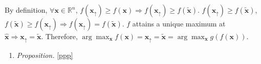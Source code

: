 \documentclass{article}
\numberwithin{equation}{section}
\begin{document}
By definition, $ \forall \mathbf{x} \in \mathbb{R}^n $,
$ f(\mathbf{x}_\uparrow) \ge f(\mathbf{x}) \Rightarrow
f(\mathbf{x}_\uparrow) \ge f(\tilde{\mathbf{x}}) $. $ f(\mathbf{x}_\uparrow)
\ge f(\tilde{\mathbf{x}}) $, $ f(\tilde{\mathbf{x}}) \ge
f(\mathbf{x}_\uparrow) \Rightarrow
f(\mathbf{x}_\uparrow) = f(\tilde{\mathbf{x}}) $. $ f $ attains a unique
maximum at $ \hat{\mathbf{x}} \Rightarrow
\mathbf{x}_\uparrow = \tilde{\mathbf{x}} $. Therefore,
$\arg\max_\mathbf{x}f(\mathbf{x}) = \mathbf{x}_\uparrow = \tilde{\mathbf{x}} =
\arg\max_\mathbf{x}g(f(\mathbf{x})) $.

\bigskip

\begin{enumerate}
    \item \label{ppp}
    \textit{Proposition.} \ref{ppp}
\end{enumerate}
\end{document}
